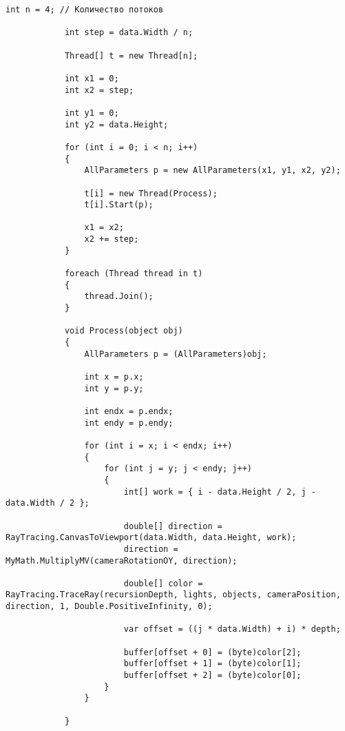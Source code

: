         \begin{lstlisting}[label=lst:rtx_parall, caption=Реализация алгоритма обратной трассировки лучей с параллельными вычислениями]
            int n = 4; // Количество потоков

            int step = data.Width / n;

            Thread[] t = new Thread[n];
       
            int x1 = 0;
            int x2 = step;

            int y1 = 0;
            int y2 = data.Height;
         
            for (int i = 0; i < n; i++)
            {
                AllParameters p = new AllParameters(x1, y1, x2, y2);

                t[i] = new Thread(Process);
                t[i].Start(p);

                x1 = x2;
                x2 += step; 
            }

            foreach (Thread thread in t)
            {
                thread.Join();
            }

            void Process(object obj)
            {
                AllParameters p = (AllParameters)obj;

                int x = p.x;
                int y = p.y;

                int endx = p.endx;
                int endy = p.endy;

                for (int i = x; i < endx; i++)
                {
                    for (int j = y; j < endy; j++)
                    {
                        int[] work = { i - data.Height / 2, j - data.Width / 2 };

                        double[] direction = RayTracing.CanvasToViewport(data.Width, data.Height, work);
                        direction = MyMath.MultiplyMV(cameraRotationOY, direction);

                        double[] color = RayTracing.TraceRay(recursionDepth, lights, objects, cameraPosition, direction, 1, Double.PositiveInfinity, 0);

                        var offset = ((j * data.Width) + i) * depth;

                        buffer[offset + 0] = (byte)color[2];
                        buffer[offset + 1] = (byte)color[1];
                        buffer[offset + 2] = (byte)color[0];
                    }
                }

            }
        \end{lstlisting}

    

\newpage
